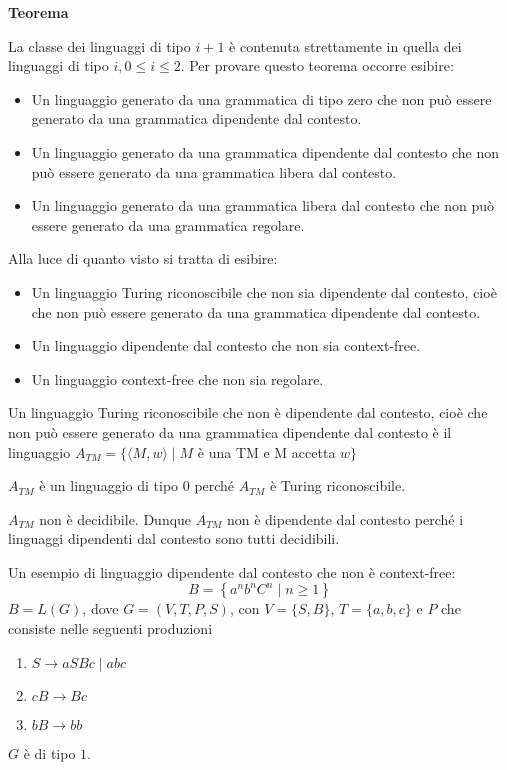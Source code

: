\textbf{Teorema}

La classe dei linguaggi di tipo $i+1$ è contenuta strettamente in quella dei linguaggi di tipo $i, 0 \leq i \leq 2$.
Per provare questo teorema occorre esibire:
\begin{itemize}
    \item Un linguaggio generato da una grammatica di tipo zero che non può essere generato da una grammatica dipendente dal contesto.
    \item Un linguaggio generato da una grammatica dipendente dal contesto che non può essere generato da una grammatica libera dal contesto.
    \item Un linguaggio generato da una grammatica libera dal contesto che non può essere generato da una grammatica regolare.
\end{itemize}
Alla luce di quanto visto si tratta di esibire:
\begin{itemize}
    \item Un linguaggio Turing riconoscibile che non sia dipendente dal contesto, cioè che non può essere generato da una grammatica dipendente dal contesto.
    \item Un linguaggio dipendente dal contesto che non sia context-free.
    \item Un linguaggio context-free che non sia regolare.
\end{itemize}

Un linguaggio Turing riconoscibile che non è dipendente dal contesto, cioè che non può essere generato da una grammatica dipendente dal contesto è il linguaggio
$A_{T M}=\{\langle M, w\rangle \mid M$ è una TM e M accetta $w\}$

$A_{T M}$ è un linguaggio di tipo 0 perché $A_{T M}$ è Turing riconoscibile.

$A_{T M}$ non è decidibile. Dunque $A_{T M}$ non è dipendente dal contesto perché i linguaggi dipendenti dal contesto sono tutti decidibili.

\vspace{5mm}

Un esempio di linguaggio dipendente dal contesto che non è context-free:
$$
B=\left\{a^{n} b^{n} C^{n} \mid n \geq 1\right\}
$$
$B=L(G)$, dove $G=(V, T, P, S)$, con $V=\{S, B\}$, $T=\{a, b, c\}$ e $P$ che consiste nelle seguenti produzioni
\begin{enumerate}
    \item $S \rightarrow a S B c \mid a b c$
    \item $c B \rightarrow B c$
    \item $b B \rightarrow b b$
\end{enumerate}
$G$ è di tipo $1 .$

